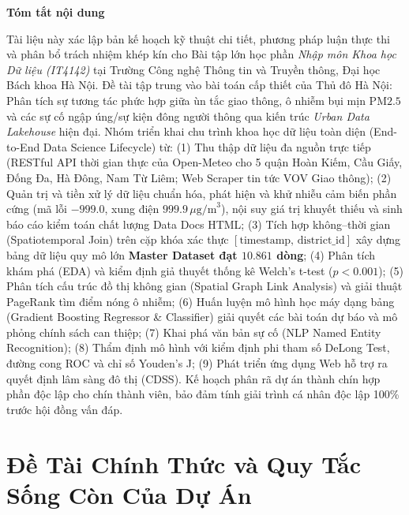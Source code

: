 \documentclass[11pt,a4paper]{article}
\begin{document}
\begin{center}
    \textbf{\large Tóm tắt nội dung}
\end{center}
\noindent
Tài liệu này xác lập bản kế hoạch kỹ thuật chi tiết, phương pháp luận thực thi và phân bổ trách nhiệm khép kín cho Bài tập lớn học phần \textit{Nhập môn Khoa học Dữ liệu (IT4142)} tại Trường Công nghệ Thông tin và Truyền thông, Đại học Bách khoa Hà Nội. Đề tài tập trung vào bài toán cấp thiết của Thủ đô Hà Nội: Phân tích sự tương tác phức hợp giữa ùn tắc giao thông, ô nhiễm bụi mịn $\text{PM2.5}$ và các sự cố ngập úng/sự kiện đông người thông qua kiến trúc \textit{Urban Data Lakehouse} hiện đại. Nhóm triển khai chu trình khoa học dữ liệu toàn diện (End-to-End Data Science Lifecycle) từ: (1) Thu thập dữ liệu đa nguồn trực tiếp (RESTful API thời gian thực của Open-Meteo cho 5 quận Hoàn Kiếm, Cầu Giấy, Đống Đa, Hà Đông, Nam Từ Liêm; Web Scraper tin tức VOV Giao thông); (2) Quản trị và tiền xử lý dữ liệu chuẩn hóa, phát hiện và khử nhiễu cảm biến phần cứng (mã lỗi $-999.0$, xung điện $999.9\,\mu\text{g/m}^3$), nội suy giá trị khuyết thiếu và sinh báo cáo kiểm toán chất lượng Data Docs HTML; (3) Tích hợp không--thời gian (Spatiotemporal Join) trên cặp khóa xác thực $[\text{timestamp}, \, \text{district\_id}]$ xây dựng bảng dữ liệu quy mô lớn \textbf{Master Dataset đạt $10.861$ dòng}; (4) Phân tích khám phá (EDA) và kiểm định giả thuyết thống kê Welch's t-test ($p < 0.001$); (5) Phân tích cấu trúc đồ thị không gian (Spatial Graph Link Analysis) và giải thuật PageRank tìm điểm nóng ô nhiễm; (6) Huấn luyện mô hình học máy dạng bảng (Gradient Boosting Regressor \& Classifier) giải quyết các bài toán dự báo và mô phỏng chính sách can thiệp; (7) Khai phá văn bản sự cố (NLP Named Entity Recognition); (8) Thẩm định mô hình với kiểm định phi tham số DeLong Test, đường cong ROC và chỉ số Youden's J; (9) Phát triển ứng dụng Web hỗ trợ ra quyết định lâm sàng đô thị (CDSS). Kế hoạch phân rã dự án thành chín hợp phần độc lập cho chín thành viên, bảo đảm tính giải trình cá nhân độc lập 100\% trước hội đồng vấn đáp.

\vspace{0.3cm}
\tableofcontents
\newpage

\section{Đề Tài Chính Thức và Quy Tắc Sống Còn Của Dự Án}
\end{document}
